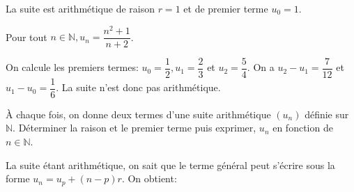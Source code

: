 \documentclass[11pt,a4paper]{article}  %
\begin{document}
\begin{enumMet}
\begin{corrBox}
		
		La suite est arithmétique de raison $r=1$ et de premier terme $u_0=1$.		
	\end{corrBox}
	\item Pour tout $n \in \mathbb{N}, u_n=\dfrac{n^2+1}{n+2}$.
	\begin{corrBox}
		On calcule les premiers termes: $u_0=\dfrac{1}{2}, u_1=\dfrac{2}{3}$ et $u_2=\dfrac{5}{4}$. On a $u_2-u_1=\dfrac{7}{12}$ et $u_1-u_0=\dfrac{1}{6}$. La suite n'est donc pas arithmétique.		
	\end{corrBox}
\end{enumMet}


À chaque fois, on donne deux termes d'une suite arithmétique $\left(u_n\right)$ définie sur $\mathbb{N}$.
Déterminer la raison et le premier terme puis exprimer, $u_n$ en fonction de $n \in \mathbb{N}$.
\begin{corrBox}
	La suite étant arithmétique, on sait que le terme général peut s'écrire sous la forme $u_n=u_p+(n-p) r$. On obtient:	
\end{corrBox}
\end{document}
